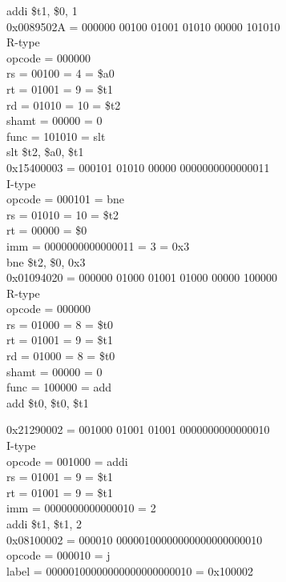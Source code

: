 \documentclass[12pt,a4paper]{report}
\begin{document}
\begin{normalsize}
addi \$t1, \$0, 1 \\ 

0x0089502A = 000000 00100 01001 01010 00000 101010 \\
R-type \\
opcode = 000000 \\
rs = 00100 = 4 = \$a0 \\
rt = 01001 = 9 = \$t1 \\
rd = 01010 = 10 = \$t2 \\
shamt = 00000 = 0 \\
func = 101010 = slt \\

slt \$t2, \$a0, \$t1 \\

0x15400003 = 000101 01010 00000 0000000000000011 \\
I-type \\
opcode = 000101 = bne \\
rs = 01010 = 10 = \$t2 \\
rt = 00000 = \$0 \\
imm = 0000000000000011 = 3 = 0x3 \\

bne \$t2, \$0, 0x3 \\

0x01094020 = 000000 01000 01001 01000 00000 100000 \\
R-type \\
opcode = 000000 \\
rs = 01000 = 8 = \$t0 \\
rt = 01001 = 9 = \$t1 \\
rd = 01000 = 8 = \$t0 \\
shamt = 00000 = 0 \\
func = 100000 = add \\

add \$t0, \$t0, \$t1

0x21290002 = 001000 01001 01001 0000000000000010 \\
I-type \\
opcode = 001000 = addi \\
rs = 01001 = 9 = \$t1 \\
rt = 01001 = 9 = \$t1 \\
imm = 0000000000000010 = 2\\

addi \$t1, \$t1, 2 \\

0x08100002 = 000010 00000100000000000000000010 \\
opcode = 000010 = j \\
label = 00000100000000000000000010 = 0x100002 \\


\end{normalsize}
\end{document}
